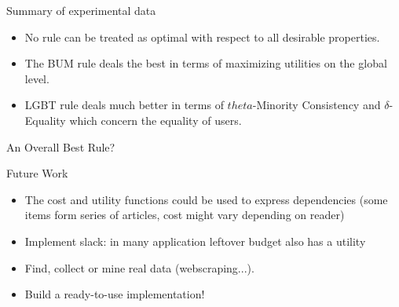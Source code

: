 \documentclass{beamer}
\begin{document}
        
       
\begin{frame}{Summary of experimental data}
	
\begin{itemize}
\item No rule can be treated as optimal with respect to all desirable properties.
\item The BUM rule deals the best in terms of maximizing utilities on the global level.

\item LGBT rule deals much better in terms of $theta$-Minority Consistency and $\delta$-Equality which concern the equality of users.
\end{itemize}
\end{frame}

\begin{frame}{An Overall Best Rule?}
	
\end{frame}

\begin{frame}{Future Work}

\begin{itemize}
	\item The cost and utility functions could be used to express dependencies (some items form series of articles, cost might vary depending on reader)
	\item Implement slack: in many application leftover budget also has a utility
	\item Find, collect or mine real data (webscraping...).
	\item Build a ready-to-use implementation!
	
\end{itemize}
	
\end{frame}
\end{document}
